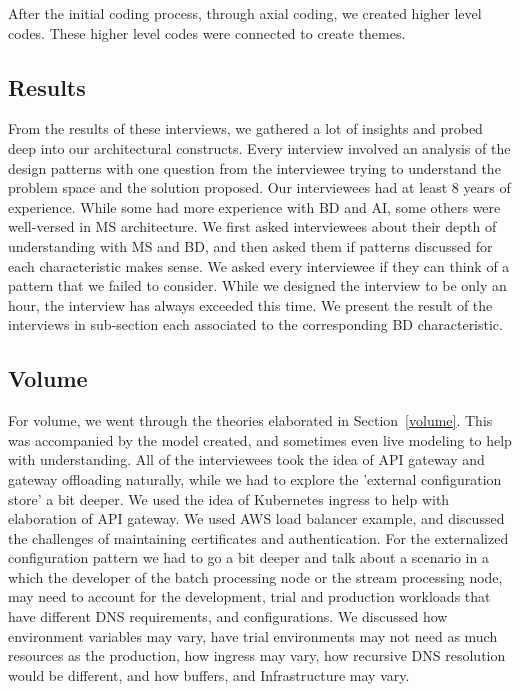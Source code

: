 \documentclass{bmcart}
\begin{document}
After the initial coding process, through axial coding, we created higher level codes. These higher level codes were connected to create themes. 


\subsection{Results}

From the results of these interviews, we gathered a lot of insights and probed deep into our architectural constructs. Every interview involved an analysis of the design patterns with one question from the interviewee trying to understand the problem space and the solution proposed. Our interviewees had at least 8 years of experience. While some had more experience with BD and AI, some others were well-versed in MS architecture. We first asked interviewees about their depth of understanding with MS and BD, and then asked them if patterns discussed for each characteristic makes sense. We asked every interviewee if they can think of a pattern that we failed to consider. While we designed the interview to be only an hour, the interview has always exceeded this time. We present the result of the interviews in sub-section each associated to the corresponding BD characteristic.



\subsection{Volume}

For volume, we went through the theories elaborated in Section~\ref{volume}. This was accompanied by the model created, and sometimes even live modeling to help with understanding. All of the interviewees took the idea of API gateway and gateway offloading naturally, while we had to explore the 'external configuration store' a bit deeper. We used the idea of Kubernetes ingress to help with elaboration of API gateway. We used AWS load balancer example, and discussed the challenges of maintaining certificates and authentication. For the externalized configuration pattern we had to go a bit deeper and talk about a scenario in a which the developer of the batch processing node or the stream processing node, may need to account for the development, trial and production workloads that have different DNS requirements, and configurations. We discussed how environment variables may vary, have trial environments may not need as much resources as the production, how ingress may vary, how recursive DNS resolution would be different, and how buffers, and Infrastructure may vary. 
\end{document}
